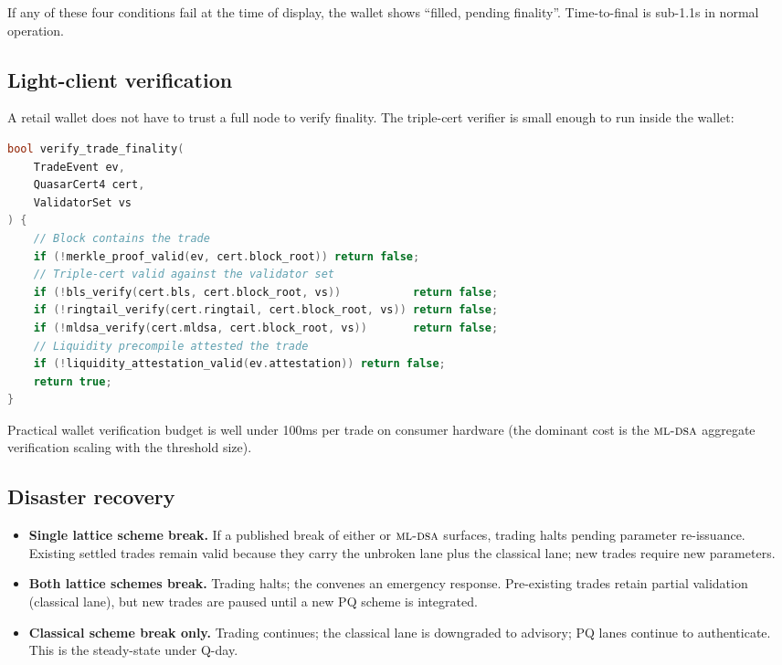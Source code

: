 If any of these four conditions fail at the time of display, the
wallet shows ``filled, pending finality''. Time-to-final is sub-1.1s
in normal operation.

\subsection{Light-client verification}

A retail wallet does not have to trust a full node to verify
finality. The triple-cert verifier is small enough to run inside
the wallet:

\begin{lstlisting}[language=C++,caption={Light-client cert verifier}]
bool verify_trade_finality(
    TradeEvent ev,
    QuasarCert4 cert,
    ValidatorSet vs
) {
    // Block contains the trade
    if (!merkle_proof_valid(ev, cert.block_root)) return false;
    // Triple-cert valid against the validator set
    if (!bls_verify(cert.bls, cert.block_root, vs))           return false;
    if (!ringtail_verify(cert.ringtail, cert.block_root, vs)) return false;
    if (!mldsa_verify(cert.mldsa, cert.block_root, vs))       return false;
    // Liquidity precompile attested the trade
    if (!liquidity_attestation_valid(ev.attestation)) return false;
    return true;
}
\end{lstlisting}

Practical wallet verification budget is well under 100ms per trade
on consumer hardware (the dominant cost is the $\textsc{ml-dsa}{}$ aggregate
verification scaling with the threshold size).

\subsection{Disaster recovery}

\begin{itemize}[leftmargin=1.2em]
  \item \textbf{Single lattice scheme break.} If a published break
        of either \Ringtail{} or $\textsc{ml-dsa}{}$ surfaces, trading halts
        pending parameter re-issuance. Existing settled trades
        remain valid because they carry the unbroken lane plus the
        classical lane; new trades require new parameters.
  \item \textbf{Both lattice schemes break.} Trading halts; the
        \DAO{} convenes an emergency response. Pre-existing trades
        retain partial validation (classical lane), but new trades
        are paused until a new PQ scheme is integrated.
  \item \textbf{Classical scheme break only.} Trading continues;
        the classical lane is downgraded to advisory; PQ lanes
        continue to authenticate. This is the steady-state under
        Q-day.
\end{itemize}

